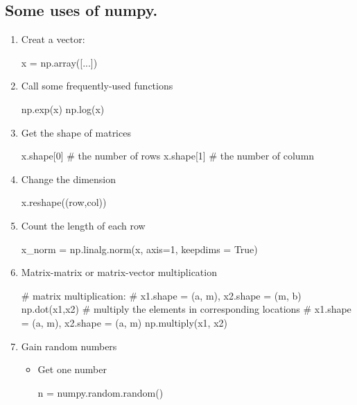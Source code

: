 \documentclass[10pt]{article}
\begin{document}
\subsection{Some uses of numpy. \protect\footnotemark[1]}


\begin{enumerate}
\item Creat a vector:
\begin{python}
x = np.array([...])
\end{python}

\item Call some frequently-used functions
\begin{python}
np.exp(x)
np.log(x)
\end{python}

\item Get the shape of matrices
\begin{python}[language=Python]
x.shape[0] # the number of rows
x.shape[1] # the number of column
\end{python}

\item Change the dimension
\begin{python}
x.reshape((row,col))
\end{python}

\item Count the length of each row
\begin{python}
x_norm = np.linalg.norm(x, axis=1, keepdims = True)
\end{python}

\item Matrix-matrix or matrix-vector multiplication
\begin{python}
# matrix multiplication: 
# x1.shape = (a, m), x2.shape = (m, b)
np.dot(x1,x2) 
# multiply the elements in corresponding locations
# x1.shape = (a, m), x2.shape = (a, m)
np.multiply(x1, x2) 
\end{python}

\item Gain random numbers

\begin{itemize}

\item Get one number
\begin{python}
n = numpy.random.random()
\end{python}


\end{itemize}
\end{enumerate}
\end{document}

